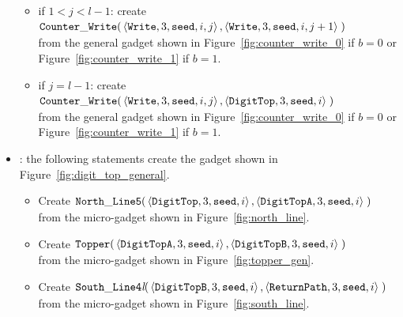 \begin{itemize}
\begin{itemize}
        \item if $1 < j < l-1$: create
        $\begin{aligned}[t]
            {\tt Counter\_Write}(&\left\langle {\tt Write}, 3, {\tt seed}, i, j \right\rangle, \left\langle {\tt Write}, 3, {\tt seed}, i, j + 1 \right\rangle \;)
        \end{aligned}$\\from the general gadget shown in Figure~\ref{fig:counter_write_0} if $b = 0$ or Figure~\ref{fig:counter_write_1} if $b = 1$.

        \item if $j = l-1$: create
        $\begin{aligned}[t]
            {\tt Counter\_Write}(&\left\langle {\tt Write}, 3, {\tt seed}, i, j \right\rangle, \left\langle {\tt DigitTop}, 3, {\tt seed}, i \right\rangle \;)
        \end{aligned}$\\from the general gadget shown in Figure~\ref{fig:counter_write_0} if $b = 0$ or Figure~\ref{fig:counter_write_1} if $b = 1$.
    \end{itemize}

    \item {\dtop}: the following statements create the gadget shown in Figure~\ref{fig:digit_top_general}.
    \begin{itemize}
        \item Create
        $\begin{aligned}[t]
            {\tt North\_Line5}(&\left\langle {\tt DigitTop},  3, {\tt seed}, i \right\rangle,
                                \left\langle {\tt DigitTopA}, 3, {\tt seed}, i \right\rangle \;)
        \end{aligned}$\\from the micro-gadget shown in Figure~\ref{fig:north_line}.

        \item Create
        $\begin{aligned}[t]
            {\tt Topper}(&\left\langle {\tt DigitTopA}, 3, {\tt seed}, i \right\rangle,
                          \left\langle {\tt DigitTopB}, 3, {\tt seed}, i \right\rangle \;)
        \end{aligned}$\\from the micro-gadget shown in Figure~\ref{fig:topper_gen}.

        \item Create
        $\begin{aligned}[t]
            {\tt South\_Line4\textit{l}}(&\left\langle {\tt DigitTopB},  3, {\tt seed}, i \right\rangle,
                                          \left\langle {\tt ReturnPath}, 3, {\tt seed}, i \right\rangle \;)
        \end{aligned}$\\from the micro-gadget shown in Figure~\ref{fig:south_line}.
    \end{itemize}


\end{itemize}
